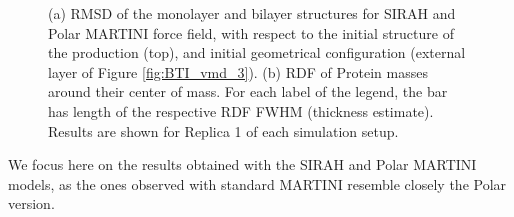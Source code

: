 \begin{figure}[h!]
\begin{minipage}[c]{0.5\textwidth}
    \end{minipage}
    \begin{minipage}[c]{0.44\textwidth}
    \end{minipage}
    \caption[Comparison of monolayer and bilayer structural properties]{(a) RMSD of the monolayer and bilayer structures for SIRAH and Polar MARTINI force field, with respect to the initial structure of the production (top), and initial geometrical configuration (external layer of Figure \ref{fig:BTI_vmd_3}). (b) RDF of Protein masses around their center of mass. For each label of the legend, the bar has length of the respective RDF FWHM (thickness estimate). Results are shown for Replica 1 of each simulation setup.}
\label{fig:mono_bi}
\end{figure}
We focus here on the results obtained with the SIRAH and Polar MARTINI models, as the ones observed with standard MARTINI resemble closely the Polar version.

